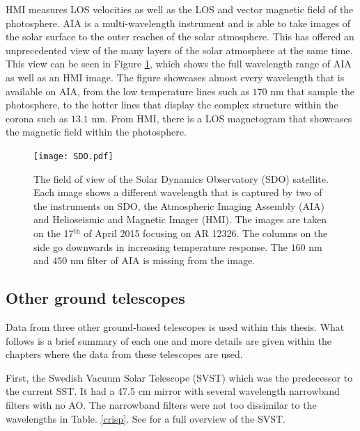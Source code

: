 	HMI measures LOS velocities as well as the LOS and vector magnetic field of the photosphere.
	AIA is a multi-wavelength instrument and is able to take images of the solar surface to the outer reaches of the solar atmosphere.
    This has offered an unprecedented view of the many layers of the solar atmosphere at the same time.
    This view can be seen in Figure \ref{fig:SDO}, which shows the full wavelength range of AIA as well as an HMI image.
    The figure showcases almost every wavelength that is available on AIA, from the low temperature lines such as $170$ nm that sample the photosphere, to the hotter lines that display the complex structure within the corona such as $13.1$ nm. 
    From HMI, there is a LOS magnetogram that showcases the magnetic field within the photosphere.
    
   	\begin{figure}
        \centering
        \texttt{[image: SDO.pdf]}
        \caption{
                The field of view of the Solar Dynamics Observatory (SDO) satellite.
                Each image shows a different wavelength that is captured by two of the instruments on SDO, the Atmospheric Imaging Assembly (AIA) and Helioseismic and Magnetic Imager (HMI).
                The images are taken on the 17$^\mathrm{th}$ of April 2015 focusing on AR 12326.
                The columns on the side go downwards in increasing temperature response.
                The $160$ nm and $450$ nm filter of AIA is missing from the image.
                }
        \label{fig:SDO}
    \end{figure}
    
\subsection{Other ground telescopes}

	Data from three other ground-based telescopes is used within this thesis.
	What follows is a brief summary of each one and more details are given within the chapters where the data from these telescopes are used.
    
	First, the Swedish Vacuum Solar Telescope (SVST) which was the predecessor to the current SST.
	It had a 47.5 cm mirror with several wavelength narrowband filters with no AO.
    The narrowband filters were not too dissimilar to the wavelengths in Table. \ref{crisp}.
    See \cite{1991AdSpR..11..129S} for a full overview of the SVST.

